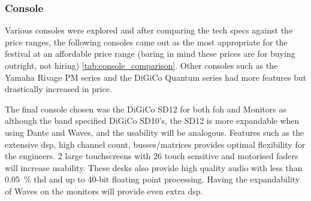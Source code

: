         \subsubsection{Console}
            Various consoles were explored and after comparing the tech specs against the price ranges, the following consoles came out as the most appropriate for the festival at an affordable price range (baring in mind these prices are for buying outright, not hiring) \ref{tab:console_comparison}. Other consoles such as the Yamaha Rivage PM series and the DiGiCo Quantum series had more features but drastically increased in price.
            
            The final console chosen was the DiGiCo SD12 for both \gls{foh} and Monitors as although the band specified DiGiCo SD10's, the SD12 is more expandable when using Dante and Waves, and the usability will be analogous. Features such as the extensive \gls{dsp}, high channel count, busses/matrices provides optimal flexibility for the engineers. 2 large touchscreens with 26 touch sensitive and motorised faders will increase usability. These desks also provide high quality audio with less than \SI{0.05}{\percent} \gls{thd} and up to 40-bit floating point processing. Having the expandability of Waves on the monitors will provide even extra \gls{dsp}.

